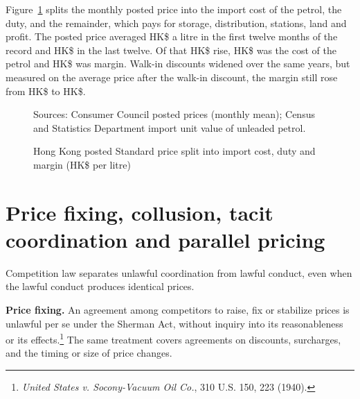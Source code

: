 \documentclass[11pt]{article}
\newcommand{\hk}{HK\$}
\begin{document}
Figure~\ref{fig:margin} splits the monthly posted price into the import cost of the petrol, the duty, and the remainder, which pays for storage, distribution, stations, land and profit. The posted price averaged \hk\postedFirst{} a litre in the first twelve months of the record and \hk\postedLast{} in the last twelve. Of that \hk\postedRise{} rise, \hk\importRise{} was the cost of the petrol and \hk\marginRise{} was margin. Walk-in discounts widened over the same years, but measured on the average price after the walk-in discount, the margin still rose from \hk\netMarginFirst{} to \hk\netMarginLast.

\begin{figure}[H]
\centering
\caption{Hong Kong posted Standard price split into import cost, duty and margin (\hk{} per litre)}
\label{fig:margin}
\par\footnotesize Sources: Consumer Council posted prices (monthly mean); Census and Statistics Department import unit value of unleaded petrol.
\end{figure}

\section{Price fixing, collusion, tacit coordination and parallel pricing}

Competition law separates unlawful coordination from lawful conduct, even when the lawful conduct produces identical prices.

\textbf{Price fixing.} An agreement among competitors to raise, fix or stabilize prices is unlawful per se under the Sherman Act, without inquiry into its reasonableness or its effects.\footnote{\emph{United States v. Socony-Vacuum Oil Co.}, 310 U.S. 150, 223 (1940).} The same treatment covers agreements on discounts, surcharges, and the timing or size of price changes.
\end{document}
